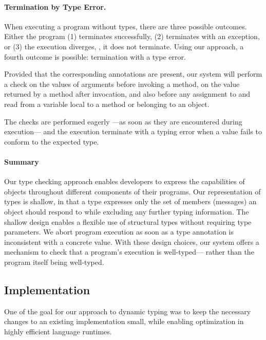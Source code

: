 \paragraph{Termination by Type Error.}
\label{sec:term-type-error}

When executing a program without types, there are three possible outcomes.
Either the program (1) terminates successfully,
(2) terminates with an exception, or 
(3) the execution diverges, \ie, it does not terminate.
Using our approach, a
fourth outcome is possible: termination with a type error.

Provided that the corresponding annotations are present, 
our system will perform a check
on the values of arguments before invoking a method, 
on the value returned by a method after invocation, and
also before any assignment to and read from a variable local to
a method or belonging to an object. 

The checks are performed eagerly%
---as soon as they are encountered during execution---%
and the execution terminate with a typing error 
when a value fails to conform to the expected type.

\paragraph{Summary}
Our type checking approach enables developers to express
the capabilities of objects throughout different components of 
their programs.
Our representation of types is shallow,
in that a type expresses only the set of members (messages) an object
should respond to while excluding any further typing information. 
The shallow design enables a flexible use of structural types without
requiring type parameters.
We abort program execution as soon as
a type annotation is inconsistent with a concrete value. 
With these design choices, our system offers a mechanism to check that a program's execution
is well-typed---%
rather than the program itself being well-typed.

\subsection{Implementation} 
\label{ssec:implementation} 

One of the goal for our approach to dynamic typing was to keep
the necessary changes to an existing implementation small,
while enabling optimization in highly efficient language runtimes.


